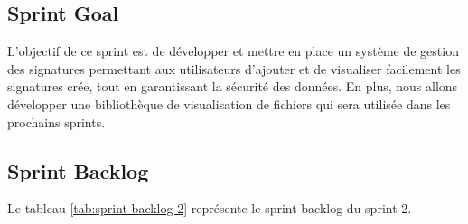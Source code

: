 \subsection{Sprint Goal}

L'objectif de ce sprint est de développer et mettre en place un système de gestion des signatures permettant aux utilisateurs d'ajouter et de visualiser facilement les signatures crée, tout en garantissant la sécurité des données. En plus, nous allons développer une bibliothèque de visualisation de fichiers qui sera utilisée dans les prochains sprints.

\subsection{Sprint Backlog}

Le tableau \ref{tab:sprint-backlog-2} représente le sprint backlog du sprint 2.

